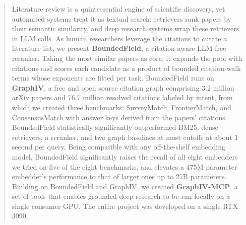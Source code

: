 \begin{abstract}
Literature review is a quintessential engine of scientific discovery, yet automated systems treat it as textual search: retrievers rank papers by their semantic similarity, and deep research systems wrap these retrievers in LLM calls. As human researchers leverage the citations to curate a literature list, we present \textbf{BoundedField}, a citation-aware LLM-free reranker. Taking the most similar papers as core, it expands the pool with citations and scores each candidate as a product of bounded citation-walk terms whose exponents are fitted per task. BoundedField runs on \textbf{GraphIV}, a free and open source citation graph comprising 3.2 million arXiv papers and 76.7 million resolved citations labeled by intent, from which we created three benchmarks: SurveyMatch, FrontierMatch, and ConsensusMatch with answer keys derived from the papers' citations. BoundedField statistically significantly outperformed BM25, dense retrievers, a reranker, and two graph baselines at most cutoffs at about 1 second per query. Being compatible with any off-the-shelf embedding model, BoundedField significantly raises the recall of all eight embedders we tried on five of the eight benchmarks, and elevates a 475M-parameter embedder's performance to that of larger ones up to 27B parameters. Building on BoundedField and GraphIV, we created \textbf{GraphIV-MCP}, a set of tools that enables grounded deep research to be run locally on a single consumer GPU. The entire project was developed on a single RTX 3090.
\end{abstract}
